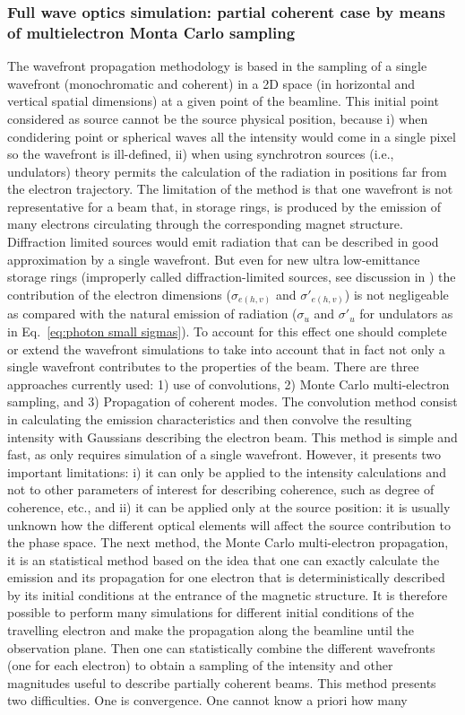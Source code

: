 \documentclass{iucr}              %
\begin{document}
\subsubsection{Full wave optics simulation: partial coherent case by means of multielectron Monta Carlo sampling}
\label{srw_me}
The wavefront propagation methodology is based in the sampling of a single wavefront (monochromatic and coherent) in a 2D space (in horizontal and vertical spatial dimensions) at a given point of the beamline. This initial point considered as source cannot be the source physical position, because i) when condidering point or spherical waves all the intensity would come in a single pixel so the wavefront is ill-defined, ii) when using synchrotron sources (i.e., undulators) theory \cite{jackson} permits the calculation of the radiation in positions far from the electron trajectory. The limitation of the method is that one wavefront is not representative for a beam that, in storage rings, is produced by the emission of many electrons circulating through the corresponding magnet structure. Diffraction limited sources would emit radiation that can be described in good approximation by a single wavefront. But even for new ultra low-emittance storage rings (improperly called diffraction-limited sources, see discussion in \cite{arxivCF}) the contribution of the electron dimensions ($\sigma_{e(h,v)}$ and $\sigma'_{e(h,v)}$) is not negligeable as compared with the natural emission of radiation ($\sigma_u$ and $\sigma'_u$ for undulators as in Eq.~\ref{eq:photon small sigmas}). To account for this effect one should complete or extend the wavefront simulations to take into account that in fact not only a single wavefront contributes to the properties of the beam. There are three approaches currently used: 1) use of convolutions, 2) Monte Carlo multi-electron sampling, and 3) Propagation of coherent modes. The convolution method consist in calculating the emission characteristics and then convolve the resulting intensity with Gaussians describing the electron beam. This method is simple and fast, as only requires simulation of a single wavefront. However, it presents two important limitations: i) it can only be applied to the intensity calculations and not to other parameters of interest for describing coherence, such as degree of coherence, etc., and ii) it can be applied only at the source position: it is usually unknown how the different optical elements will affect the source contribution to the phase space. The next method, the Monte Carlo multi-electron propagation, it is an statistical method based on the idea that one can exactly calculate the emission and its propagation for one electron that is deterministically described by its initial conditions at the entrance of the magnetic structure. It is therefore possible to perform many simulations for different initial conditions of the travelling electron and make the propagation along the beamline until the observation plane. Then one can statistically combine the different wavefronts (one for each electron) to obtain a sampling of the intensity and other magnitudes useful to describe partially coherent beams. This method presents two difficulties. One is convergence. One cannot know a priori how many 
\end{document}
